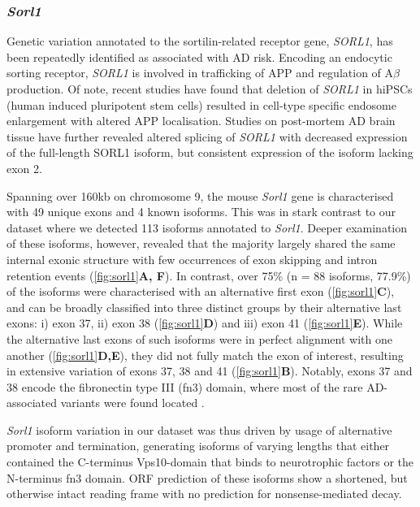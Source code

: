 \newpage
\subsubsection{\textit{Sorl1}}
Genetic variation annotated to the sortilin-related receptor gene, \textit{SORL1}, has been repeatedly identified as associated with AD risk\cite{Fernandez2016}. Encoding an endocytic sorting receptor, \textit{SORL1} is involved in trafficking of APP and regulation of A$\beta$ production\cite{Knupp2020}. Of note, recent studies have found that deletion of \textit{SORL1} in hiPSCs (human induced pluripotent stem cells) resulted in cell-type specific endosome enlargement with altered APP localisation\cite{Knupp2020}. Studies on post-mortem AD brain tissue have further revealed altered splicing of \textit{SORL1} with decreased expression of the full-length SORL1 isoform, but consistent expression of the isoform lacking exon 2\cite{Grear2009}.  

Spanning over 160kb on chromosome 9, the mouse \textit{Sorl1} gene is characterised with 49 unique exons and 4 known isoforms. This was in stark contrast to our dataset where we detected 113 isoforms annotated to \textit{Sorl1}. Deeper examination of these isoforms, however, revealed that the majority largely shared the same internal exonic structure with few occurrences of exon skipping and intron retention events (\cref{fig:sorl1}\textbf{A, F}). In contrast, over 75\% (n = 88 isoforms, 77.9\%) of the isoforms were characterised with an alternative first exon (\cref{fig:sorl1}\textbf{C}), and can be broadly classified into three distinct groups by their alternative last exons: i) exon 37, ii) exon 38 (\cref{fig:sorl1}\textbf{D}) and iii) exon 41 (\cref{fig:sorl1}\textbf{E}). While the alternative last exons of such isoforms were in perfect alignment with one another (\cref{fig:sorl1}\textbf{D,E}), they did not fully match the exon of interest, resulting in extensive variation of exons 37, 38 and 41 (\cref{fig:sorl1}\textbf{B}). Notably, exons 37 and 38 encode the fibronectin type III (fn3) domain, where most of the rare AD-associated variants were found located \cite{Verheijen2016}. 

\textit{Sorl1} isoform variation in our dataset was thus driven by usage of alternative promoter and termination, generating isoforms of varying lengths that either contained the C-terminus Vps10-domain that binds to neurotrophic factors or the N-terminus fn3 domain. ORF prediction of these isoforms show a shortened, but otherwise intact reading frame with no prediction for nonsense-mediated decay. 

